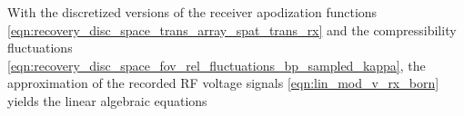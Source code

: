 With
the discretized versions of
the receiver apodization functions
\eqref{eqn:recovery_disc_space_trans_array_spat_trans_rx} and
the compressibility fluctuations
\eqref{eqn:recovery_disc_space_fov_rel_fluctuations_bp_sampled_kappa},
the  approximation of
the recorded \ac{RF} voltage signals
\eqref{eqn:lin_mod_v_rx_born} yields
the linear algebraic equations
